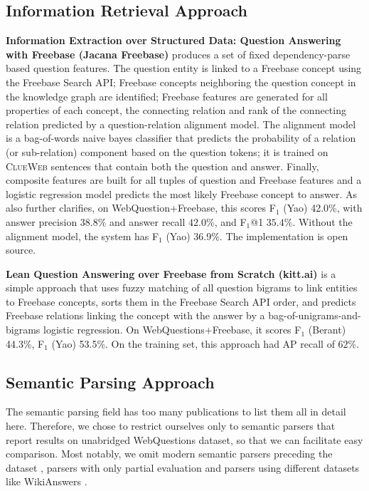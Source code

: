 \subsection{Information Retrieval Approach}

\textbf{Information Extraction over Structured Data: Question Answering with Freebase (Jacana Freebase)} \citep{TreeFreebase2014Yao}
	produces a set of fixed dependency-parse based question features.
	The question entity is linked to a Freebase concept using the Freebase Search API;
	Freebase concepts neighboring the question concept in the knowledge
	graph are identified;
	Freebase features are generated for all
	properties of each concept, the connecting relation and rank
	of the connecting relation predicted by a question-relation
	alignment model.  The alignment model is a bag-of-words
	naive bayes classifier that predicts the probability of a relation
	(or sub-relation) component based on the question tokens;
	it is trained on \textsc{ClueWeb} sentences that contain
	both the question and answer.
	Finally, composite features are built for all tuples of question and Freebase features
	and a logistic regression model predicts the most likely Freebase concept to answer.
	As \citep{FreebaseQA2014Yao} also further clarifies,
	on WebQuestion+Freebase, this scores F$_1$ (Yao) 42.0\%,
	with answer precision $38.8\%$ and answer recall $42.0\%$,
	and F$_1$@1 $35.4\%$.
	Without the alignment model, the system has F$_1$ (Yao) 36.9\%.
	The implementation is open source.

\textbf{Lean Question Answering over Freebase from Scratch (kitt.ai)} \citep{LeanFreebaseYao}
	is a simple approach that uses
	fuzzy matching of all question bigrams to link entities to Freebase concepts,
	sorts them in the Freebase Search API order,
	and predicts Freebase relations linking the concept with the answer
	by a bag-of-unigrams-and-bigrams logistic regression.
	On WebQuestions+Freebase, it scores F$_1$ (Berant) 44.3\%, F$_1$ (Yao) 53.5\%.
	On the training set, this approach had AP recall of $62\%$.

\subsection{Semantic Parsing Approach}

The semantic parsing field has too many publications to list them all
in detail here.  Therefore, we chose to restrict ourselves only to
semantic parsers that report results on unabridged WebQuestions dataset,
so that we can facilitate easy comparison.
Most notably, we omit modern semantic parsers preceding the dataset
\citep{SPKwiatkowski2013, SPCai2013},
parsers with only partial evaluation \citep{SPReddy2014}
and parsers using different datasets like WikiAnswers \cite{Fader2013Paraphrase}.

